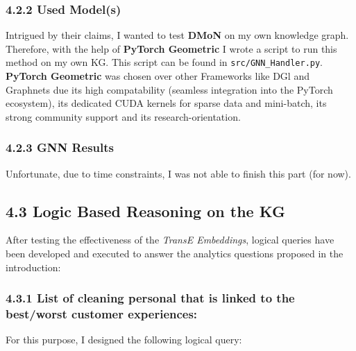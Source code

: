 \documentclass[
]{article}
\begin{document}
\subsubsection{4.2.2 Used Model(s)}\label{used-models-1}

Intrigued by their claims, I wanted to test \textbf{DMoN} on my own
knowledge graph. Therefore, with the help of \textbf{PyTorch Geometric}
I wrote a script to run this method on my own KG. This script can be
found in \texttt{src/GNN\_Handler.py}. \\
 \textbf{PyTorch Geometric} was
chosen over other Frameworks like DGl and Graphnets due its high
compatability (seamless integration into the PyTorch ecosystem), its
dedicated CUDA kernels for sparse data and mini-batch, its strong
community support and its research-orientation.

\subsubsection{4.2.3 GNN Results}\label{gnn-results}

Unfortunate, due to time constraints, I was not able to finish this part
(for now).

\subsection{4.3 Logic Based Reasoning on the
KG}\label{logic-based-reasoning-on-the-kg}

After testing the effectiveness of the \emph{TransE Embeddings}, logical
queries have been developed and executed to answer the analytics
questions proposed in the introduction:

\subsubsection{4.3.1 List of cleaning personal that is linked to the
best/worst customer
experiences:}\label{list-of-cleaning-personal-that-is-linked-to-the-bestworst-customer-experiences}

For this purpose, I designed the following logical query:

\vspace*{10mm}
\end{document}
